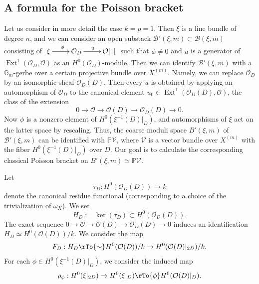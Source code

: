 \documentclass[reqno]{amsart}
\theoremstyle{definition}
\theoremstyle{remark}
\newcommand{\G}{{\mathbb G}}
\renewcommand{\P}{{\mathbb P}}
\newcommand{\Ext}{\operatorname{Ext}}
\newcommand{\OO}{{\mathcal O}}
\newcommand{\sub}{\subset}
\newcommand{\om}{\omega}
\newcommand{\cV}{\mathcal{V}}
\newcommand{\cO}{\mathcal{O}}
\newcommand{\sB}{\mathscr{B}}
\numberwithin{equation}{section}
\begin{document}
\subsection{A formula for the Poisson bracket}

Let us consider in more detail the case $k=p=1$. Then $\xi$ is a line bundle of degree $n$, and we can consider an open substack $\sB'(\xi,m)\subset \sB(\xi,m)$
consisting of 
$\xymatrix{\xi\ar[r]^{\phi} & \cO_D \ar[r]^{u} & \cO[1]}$
such that $\phi\neq 0$ and $u$ is a generator of $\Ext^1(\cO_D,\cO)$ as an $H^0(\cO_D)$-module.
Then we can identify $\sB'(\xi,m)$ with a $\G_m$-gerbe over a certain projective bundle over $X^{(m)}$. Namely, we can replace $\cO_D$ by an isomorphic sheaf $\cO_D(D)$.
Then every $u$ is obtained by applying an automorphism of $\cO_D$ to the canonical element $u_0\in \Ext^1(\cO_D(D),\cO)$, the class of the extension
$$0\to \cO\to \cO(D)\to \cO_D(D)\to 0.$$
Now $\phi$ is a nonzero element of $H^0(\xi^{-1}(D)|_D)$, and automorphisms of $\xi$ act on the latter space by rescaling.
Thus, the coarse moduli space $B'(\xi,m)$ of $\sB'(\xi,m)$ can be identified with $\P \cV$, where $\cV$ is a vector bundle over $X^{(m)}$ with the fiber $H^0(\xi^{-1}(D)|_D)$ over $D$.
Our goal is to calculate the corresponding classical Poisson bracket on $B'(\xi,m)\simeq \P \cV$. 

Let 
$$\tau_D:H^0(\OO_D(D))\to k$$
denote the canonical residue functional (corresponding to a choice of the trivialization of $\om_X$). 
We set
$$H_D:=\ker(\tau_D)\sub H^0(\OO_D(D)).$$
The exact sequence $0\to \OO\to \OO(D)\to \OO_D(D)\to 0$ induces an identification $H_D\simeq H^0(\OO(D))/k$. We consider the map
$$F_D:H_D\rTo{\sim} H^0(\OO(D))/k\to H^0(\OO(D)|_{2D})/k.$$
For each $\phi\in H^0(\xi^{-1}(D)|_D)$, we consider the induced map
$$\rho_\phi: H^0(\xi|_{2D})\to H^0(\xi|_D)\rTo{\phi} H^0(\OO(D)|_D).$$
\end{document}
